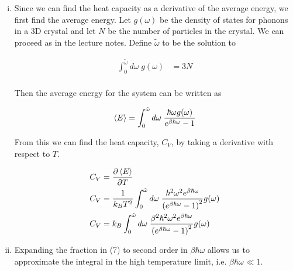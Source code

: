 \documentclass[]{article}
\begin{document}
\begin{enumerate}[(i)]

\item Since we can find the heat capacity as a derivative of the average energy, we first find the average energy. Let $g(\omega)$ be the density of states for phonons in a 3D crystal and let $N$ be the number of particles in the crystal. We can proceed as in the lecture notes. Define $\tilde{\omega}$ to be the solution to

\begin{equation}
\begin{split}
\int_{0}^{\tilde{\omega}}d\omega  \; g(\omega) & = 3N \\
\end{split}
\end{equation}

Then the average energy for the system can be written as

\begin{equation}
\begin{split}
\expval{E} & = \int_{0}^{\tilde{\omega}} d\omega \;  \frac{ \hbar \omega g(\omega ) }{ e^{\beta\hbar\omega} - 1  } \\
\end{split}
\end{equation}

From this we can find the heat capacity, $C_V$, by taking a derivative with respect to $T$.

\begin{equation}
\begin{split}
C_V & = \pdv{\expval{E}}{T} \\
C_V & = \frac{ 1 }{ k_B T^2  } \int_{0}^{\tilde{\omega}} d\omega \;  \frac{  \hbar^2  \omega^2   e^{\beta\hbar\omega} }{ \left( e^{\beta\hbar\omega} - 1 \right)^2 } g(\omega )  \\
C_V & =  k_B \int_{0}^{\tilde{\omega}} d\omega \;  \frac{ \beta^2  \hbar^2  \omega^2   e^{\beta\hbar\omega} }{ \left( e^{\beta\hbar\omega} - 1 \right)^2 } g(\omega )  \\
\end{split}
\end{equation}

\item Expanding the fraction in (7) to second order in $\beta\hbar\omega$ allows us to approximate the integral in the high temperature limit, i.e. $\beta\hbar\omega \ll 1$.


\end{enumerate}
\end{document}
